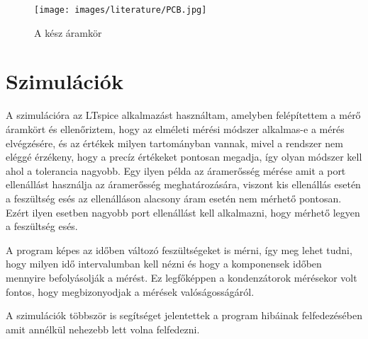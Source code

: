 \begin{figure}[H]
    \centering
    \texttt{[image: images/literature/PCB.jpg]}
    \caption{A kész áramkör}
    \label{fig:Aramkor}
\end{figure}

\section{Szimulációk}

A szimulációra az LTspice \cite{LTspice} alkalmazást használtam, 
amelyben felépítettem a mérő áramkört és ellenőriztem, hogy az elméleti
mérési módszer alkalmas-e a mérés elvégzésére, és az értékek milyen
tartományban vannak, mivel a rendszer nem eléggé érzékeny, hogy a precíz
értékeket pontosan megadja, így olyan módszer kell ahol a tolerancia nagyobb.
Egy ilyen példa az áramerősség mérése amit a port ellenállást használja az
áramerősség meghatározására, viszont kis ellenállás esetén a
feszültség esés az ellenálláson alacsony áram esetén nem mérhető pontosan.
Ezért ilyen esetben nagyobb port ellenállást kell alkalmazni, hogy mérhető 
legyen a feszültség esés.

A program képes az időben változó feszültségeket is mérni, így
meg lehet tudni, hogy milyen idő intervalumban kell nézni és hogy
a komponensek időben mennyire befolyásolják a mérést. Ez 
legfőképpen a kondenzátorok mérésekor volt fontos, hogy megbizonyodjak
a mérések valóságosságáról.

A szimulációk többször is segítséget jelentettek a program 
hibáinak felfedezésében amit annélkül nehezebb lett volna felfedezni.

